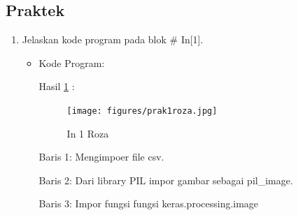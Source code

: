 \subsection{Praktek}
\begin{enumerate}
\item Jelaskan kode program pada blok \# In[1].
\begin{itemize}
\item Kode Program:

\par Hasil \ref{in1roza} :
\begin{figure}[!hbtp]
\centering
\texttt{[image: figures/prak1roza.jpg]}
\caption{In 1 Roza}
\label{in1roza}
\end{figure}
\par Baris 1: Mengimpoer file csv.
\par Baris 2: Dari library PIL impor gambar sebagai pil\_image.
\par Baris 3: Impor fungsi fungsi keras.processing.image
\end{itemize}
\par


\end{enumerate}
